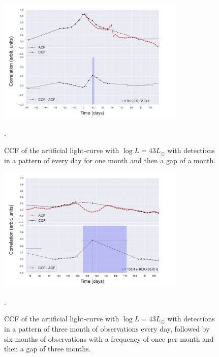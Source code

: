 \documentclass[letterpaper, oneside]{article}
\begin{document}
\begin{figure}[h]
	\centering
	\includegraphics[width=0.8\textwidth]{../CCF_plots/artificial_x_y_month.pdf}
	\caption{CCF of the artificial light-curve with $\log L = 43 L_{\odot}$ with detections in a pattern of every day for one month and then a gap of a month.}.
	\label{fig:ccf_art_lc_L43_month}
\end{figure}

\begin{figure}[h]
	\centering
	\includegraphics[width=0.8\textwidth]{../CCF_plots/artificial_x_y_lgaps.pdf}
	\caption{CCF of the artificial light-curve with $\log L = 43 L_{\odot}$ with detections in a pattern of three month of observations every day, followed by six months of observations with a frequency of once per month and then a gap of three months.}.
	\label{fig:ccf_art_lc_L43_lgaps}
\end{figure}
\end{document}
